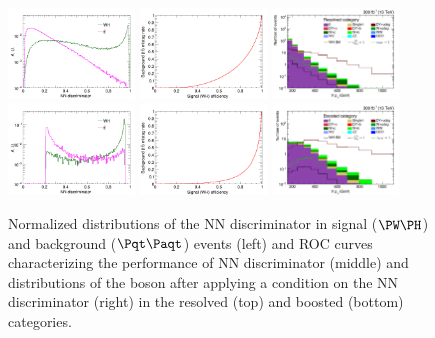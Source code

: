 \documentclass[a4paper,11pt]{article}
\newcommand{\Pt}{{{\Pqt}}\xspace}
\newcommand{\PAt}{{{{\Paqt}}}\xspace}
\begin{document}
\begin{figure}[hbtp]
\begin{center}
\includegraphics[width=0.3\textwidth]{Figures/New/RECO/Plot_WH_MVA_WH_fast_resolved.png}
\includegraphics[width=0.3\textwidth]{Figures/New/RECO/ROC_plot_TT_MVA_resolved.png}
\includegraphics[width=0.3\textwidth]{Figures/New/RECO/Plot_Resolved_SR_V_pt.pdf}
\includegraphics[width=0.3\textwidth]{Figures/New/RECO/Plot_WH_MVA_WH_fast_boosted.png}
\includegraphics[width=0.3\textwidth]{Figures/New/RECO/ROC_plot_TT_MVA_boosted.png}
\includegraphics[width=0.3\textwidth]{Figures/New/RECO/Plot_Boosted_SR_V_pt.pdf}
\end{center}
\caption{
Normalized distributions of the NN discriminator in signal ($\PW\PH$) and background ($\Pt\PAt$) events (left) and ROC curves characterizing the performance of NN discriminator (middle) and  distributions of the \PW boson \pt after applying a condition on the NN discriminator (right) in the resolved (top) and boosted (bottom) categories.
}
\label{fig:MVA}
\end{figure}
\end{document}
